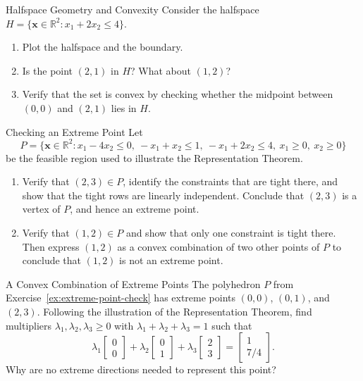 \begin{ex}{Halfspace Geometry and Convexity}{}
Consider the halfspace \( H = \{ \mathbf{x} \in \mathbb{R}^2 : x_1 + 2x_2 \leq 4 \} \).
\begin{enumerate}
    \item Plot the halfspace and the boundary.
    \item Is the point \( (2,1) \) in \( H \)? What about \( (1,2) \)?
    \item Verify that the set is convex by checking whether the midpoint between \( (0,0) \) and \( (2,1) \) lies in \( H \).
\end{enumerate}
\end{ex}

\begin{ex}{Checking an Extreme Point}{}
\label{ex:extreme-point-check}
Let
\[
P = \{ \mathbf{x} \in \mathbb{R}^2 : x_1 - 4x_2 \leq 0,\ -x_1 + x_2 \leq 1,\ -x_1 + 2x_2 \leq 4,\ x_1 \geq 0,\ x_2 \geq 0 \}
\]
be the feasible region used to illustrate the Representation Theorem.
\begin{enumerate}
    \item Verify that \( (2,3) \in P \), identify the constraints that are tight there, and show that the tight rows are linearly independent. Conclude that \( (2,3) \) is a vertex of \( P \), and hence an extreme point.
    \item Verify that \( (1,2) \in P \) and show that only one constraint is tight there. Then express \( (1,2) \) as a convex combination of two other points of \( P \) to conclude that \( (1,2) \) is not an extreme point.
\end{enumerate}
\exrefs{\S\ref{sec:algebraic-vertex-proof}, \S\ref{sec:convexity}}
\end{ex}

\begin{ex}{A Convex Combination of Extreme Points}{}
\label{ex:rep-theorem-combo}
The polyhedron \( P \) from Exercise~\ref{ex:extreme-point-check} has extreme points \( (0,0) \), \( (0,1) \), and \( (2,3) \). Following the illustration of the Representation Theorem, find multipliers \( \lambda_1, \lambda_2, \lambda_3 \geq 0 \) with \( \lambda_1 + \lambda_2 + \lambda_3 = 1 \) such that
\[
\lambda_1 \begin{bmatrix} 0 \\ 0 \end{bmatrix} + \lambda_2 \begin{bmatrix} 0 \\ 1 \end{bmatrix} + \lambda_3 \begin{bmatrix} 2 \\ 3 \end{bmatrix} = \begin{bmatrix} 1 \\ 7/4 \end{bmatrix}.
\]
Why are no extreme directions needed to represent this point?
\end{ex}

